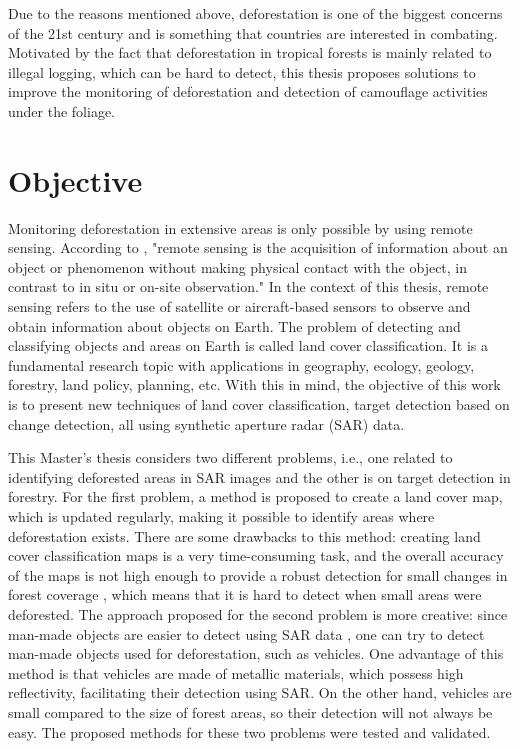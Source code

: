 Due to the reasons mentioned above, deforestation is one of the biggest concerns of the 21st century and is something that countries are interested in combating. Motivated by the fact that deforestation in tropical forests is mainly related to illegal logging, which can be hard to detect, this thesis proposes solutions to improve the monitoring of deforestation and detection of camouflage activities under the foliage.

\section{Objective}
Monitoring deforestation in extensive areas is only possible by using remote sensing. According to \cite{Schott1996RemoteST}, "remote sensing is the acquisition of information about an object or phenomenon without making physical contact with the object, in contrast to in situ or on-site observation." In the context of this thesis, remote sensing refers to the use of satellite or aircraft-based sensors to observe and obtain information about objects on Earth. The problem of detecting and classifying objects and areas on Earth is called land cover classification. It is a fundamental research topic with applications in geography, ecology, geology, forestry, land policy, planning, etc. With this in mind, the objective of this work is to present new techniques of land cover classification, target detection based on change detection, all using synthetic aperture radar (SAR) data.

This Master's thesis considers two different problems, i.e., one related to identifying deforested areas in SAR images and the other is on target detection in forestry. For the first problem, a method is proposed to create a land cover map, which is updated regularly, making it possible to identify areas where deforestation exists. There are some drawbacks to this method: creating land cover classification maps is a very time-consuming task, and the overall accuracy of the maps is not high enough to provide a robust detection for small changes in forest coverage \cite{Rodrigo}, which means that it is hard to detect when small areas were deforested. The approach proposed for the second problem is more creative: since man-made objects are easier to detect using SAR data \cite{manmade}, one can try to detect man-made objects used for deforestation, such as vehicles. One advantage of this method is that vehicles are made of metallic materials, which possess high reflectivity, facilitating their detection using SAR. On the other hand, vehicles are small compared to the size of forest areas, so their detection will not always be easy. The proposed methods for these two problems were tested and validated.

